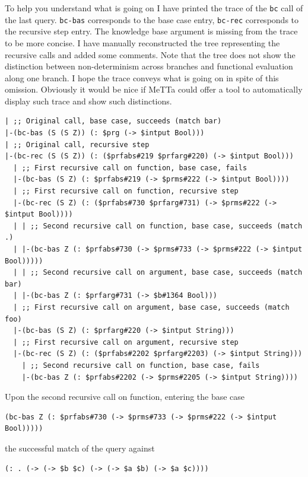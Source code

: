 \documentclass[]{report}
\begin{document}
To help you understand what is going on I have printed the trace of
the \texttt{bc} call of the last query.
\texttt{bc-bas} corresponds to the base case entry,
\texttt{bc-rec} corresponds to the recursive step entry.
The knowledge base argument is missing from the trace to be more
concise.  I have manually reconstructed the tree representing the
recursive calls and added some comments.  Note that the tree does not
show the distinction between non-determinism across branches and
functional evaluation along one branch.  I hope the trace conveys what
is going on in spite of this omission.  Obviously it would be nice if
MeTTa could offer a tool to automatically display such trace and show
such distinctions.\\
\begin{footnotesize}
\begin{verbatim}
| ;; Original call, base case, succeeds (match bar)
|-(bc-bas (S (S Z)) (: $prg (-> $intput Bool)))
| ;; Original call, recursive step
|-(bc-rec (S (S Z)) (: ($prfabs#219 $prfarg#220) (-> $intput Bool)))
  | ;; First recursive call on function, base case, fails
  |-(bc-bas (S Z) (: $prfabs#219 (-> $prms#222 (-> $intput Bool))))
  | ;; First recursive call on function, recursive step
  |-(bc-rec (S Z) (: ($prfabs#730 $prfarg#731) (-> $prms#222 (-> $intput Bool))))
  | | ;; Second recursive call on function, base case, succeeds (match .)
  | |-(bc-bas Z (: $prfabs#730 (-> $prms#733 (-> $prms#222 (-> $intput Bool)))))
  | | ;; Second recursive call on argument, base case, succeeds (match bar)
  | |-(bc-bas Z (: $prfarg#731 (-> $b#1364 Bool)))
  | ;; First recursive call on argument, base case, succeeds (match foo)
  |-(bc-bas (S Z) (: $prfarg#220 (-> $intput String)))
  | ;; First recursive call on argument, recursive step
  |-(bc-rec (S Z) (: ($prfabs#2202 $prfarg#2203) (-> $intput String)))
    | ;; Second recursive call on function, base case, fails
    |-(bc-bas Z (: $prfabs#2202 (-> $prms#2205 (-> $intput String))))
\end{verbatim}
\end{footnotesize} Upon the second recursive call on function, entering the base case
\begin{small}
\begin{verbatim}
(bc-bas Z (: $prfabs#730 (-> $prms#733 (-> $prms#222 (-> $intput Bool)))))
\end{verbatim}
\end{small} the successful match of the query against
\begin{small}
\begin{verbatim}
(: . (-> (-> $b $c) (-> (-> $a $b) (-> $a $c))))
\end{verbatim}
\end{small}
\end{document}
